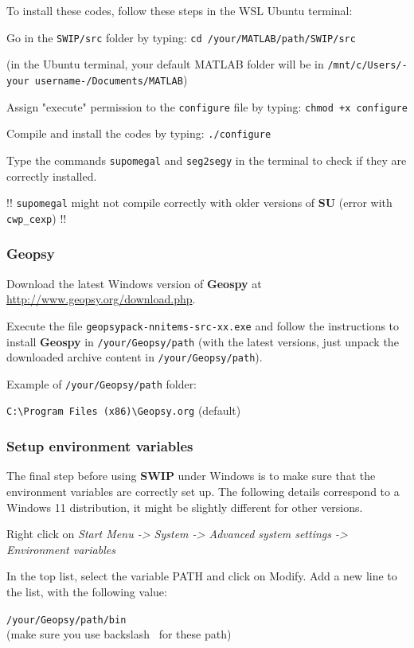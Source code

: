 \documentclass[twoside,a4paper]{article}
\def\SWIP{\textbf{SWIP}}
\def\SU{\textbf{SU}}
\def\Geopsy{\textbf{Geospy}}
\begin{document}
To install these codes, follow these steps in the WSL Ubuntu terminal:

Go in the \verb|SWIP/src| folder by typing: \verb|cd /your/MATLAB/path/SWIP/src|

(in the Ubuntu terminal, your default MATLAB folder will be in \verb|/mnt/c/Users/-your username-/Documents/MATLAB|)

Assign "execute" permission to the \verb|configure| file by typing: \verb|chmod +x configure|

Compile and install the codes by typing: \verb|./configure|

Type the commands \verb|supomegal| and \verb|seg2segy| in the terminal to check if they are correctly installed.

!! \verb|supomegal| might not compile correctly with older versions of {\SU} (error with \verb|cwp_cexp|) !!

\subsubsection{Geopsy}
Download the latest Windows version of {\Geopsy} at \url{http://www.geopsy.org/download.php}.

Execute the file \verb|geopsypack-nnitems-src-xx.exe| and follow the instructions to install {\Geopsy} in \verb|/your/Geopsy/path| (with the latest versions, just unpack the downloaded archive content in \verb|/your/Geopsy/path|).

Example of \verb|/your/Geopsy/path| folder:

\verb|C:\Program Files (x86)\Geopsy.org| (default)

\subsubsection{Setup environment variables}
The final step before using {\SWIP} under Windows is to make sure that the environment variables are correctly set up. The following details correspond to a Windows 11 distribution, it might be slightly different for other versions.

Right click on \textit{Start Menu -> System -> Advanced system settings -> Environment variables}

In the top list, select the variable PATH and click on Modify. Add a new line to the list, with the following value:

\verb|/your/Geopsy/path/bin|\\ (make sure you use backslash \ for these path)
\end{document}
